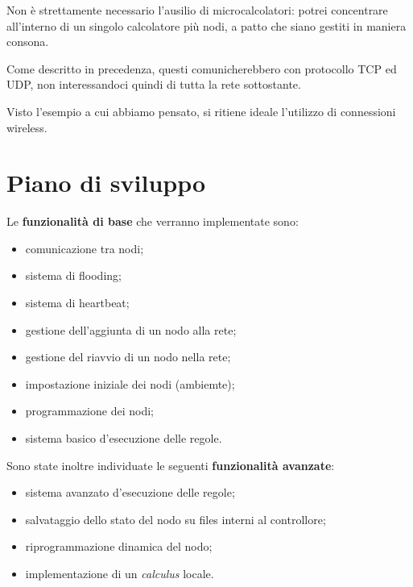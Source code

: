 \documentclass{memoir}
\begin{document}
Non è strettamente necessario l'ausilio di microcalcolatori: potrei concentrare
	   all'interno di un singolo calcolatore più nodi, a patto che siano gestiti in maniera
	   consona. 

Come descritto in precedenza, questi comunicherebbero con protocollo TCP ed UDP,
	   non interessandoci quindi di tutta la rete sottostante.

Visto l'esempio a cui abbiamo pensato, si ritiene ideale l'utilizzo di connessioni
	   wireless.
\section{Piano di sviluppo}
Le \textbf{funzionalità di base} che verranno implementate sono:
\begin{itemize}
	\item comunicazione tra nodi;
	\item sistema di flooding;
	\item sistema di heartbeat;
	\item gestione dell'aggiunta di un nodo alla rete;
	\item gestione del riavvio di un nodo nella rete;
	\item impostazione iniziale dei nodi (ambiemte);
	\item programmazione dei nodi;
	\item sistema basico d'esecuzione delle regole.
\end{itemize}
Sono state inoltre individuate le seguenti \textbf{funzionalità avanzate}:
\begin{itemize}
	\item sistema avanzato d'esecuzione delle regole;
	\item salvataggio dello stato del nodo su files interni al controllore;
	\item riprogrammazione dinamica del nodo;
	\item implementazione di un \emph{calculus} locale.
\end{itemize}
\end{document}
